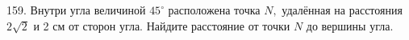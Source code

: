159. Внутри угла величиной $45^\circ$ расположена точка $N,$ удалённая на расстояния $2\sqrt{2}$ и 2 см от сторон угла.
Найдите расстояние от точки $N$ до вершины угла.\\
